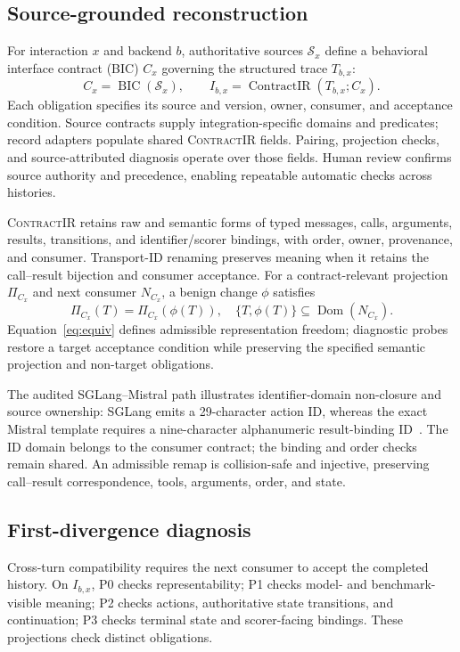 \documentclass[letterpaper]{article}
\newcommand{\contractir}{\textsc{ContractIR}\xspace}
\begin{document}
\subsection{Source-grounded reconstruction}
For interaction $x$ and backend $b$, authoritative sources $\mathcal S_x$
define a behavioral interface contract (BIC) $C_x$ governing the structured
trace $T_{b,x}$:
\begin{equation}
 C_x=\operatorname{BIC}(\mathcal S_x),\qquad
 I_{b,x}=\operatorname{ContractIR}(T_{b,x};C_x).
 \label{eq:objects}
\end{equation}
Each obligation specifies its source and version, owner, consumer, and acceptance condition.
Source contracts supply integration-specific domains and predicates; record
adapters populate shared \contractir fields. Pairing, projection checks, and
source-attributed diagnosis operate over those fields. Human review confirms
source authority and precedence, enabling repeatable automatic checks
across histories.

\contractir retains raw and semantic forms of typed messages, calls,
arguments, results, transitions, and identifier/scorer bindings, with order,
owner, provenance, and consumer. Transport-ID renaming preserves meaning when
it retains the call--result bijection and consumer acceptance. For a
contract-relevant projection $\Pi_{C_x}$ and next consumer $N_{C_x}$,
a benign change $\phi$ satisfies
\begin{equation}
 \Pi_{C_x}(T)=\Pi_{C_x}(\phi(T)),\quad
 \{T,\phi(T)\}\subseteq\operatorname{Dom}(N_{C_x}).
 \label{eq:equiv}
\end{equation}
Equation~\eqref{eq:equiv} defines admissible representation freedom;
diagnostic probes restore a target acceptance condition while preserving
the specified semantic projection and non-target obligations.

The audited SGLang--Mistral path illustrates identifier-domain non-closure
and source ownership:
SGLang emits a 29-character action ID, whereas the exact Mistral template
requires a nine-character alphanumeric result-binding ID~\cite{mistralai_v03_modelcard}.
The ID domain belongs to the consumer contract; the binding and order checks
remain shared. An admissible remap is collision-safe and injective, preserving
call--result correspondence, tools, arguments, order, and state.

\subsection{First-divergence diagnosis}
Cross-turn compatibility requires the next consumer to accept the completed history. On $I_{b,x}$, P0 checks representability;
P1 checks model- and benchmark-visible meaning; P2 checks actions,
authoritative state transitions, and continuation; P3 checks terminal state
and scorer-facing bindings. These projections check distinct obligations.
\end{document}
